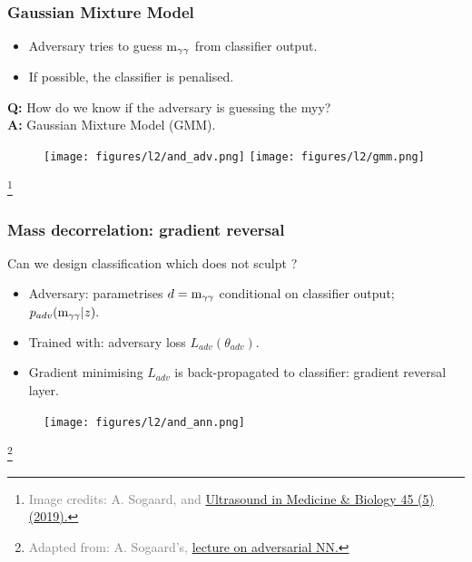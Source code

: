 \documentclass[11pt,xcolor=dvipsnames,aspectratio=169]{beamer}
\newcommand\blfootnote[1]{%
  \begingroup
  \renewcommand\thefootnote{}\footnote{\hspace{-30pt}\textcolor{Gray}{\tiny #1}}%
  \addtocounter{footnote}{-1}%
  \endgroup
}
\begin{document}
\begin{frame}
  \frametitle{\bf Gaussian Mixture Model}
  \begin{itemize}
  \item \textcolor{EDBRed}{Adversary} tries to guess $\mathrm{m}_{\gamma\gamma}$ from classifier output.
  \item If possible, the \textcolor{EDBBlue}{classifier} is penalised.
  \end{itemize}
  {\bf Q:} How do we know if the adversary is guessing the myy?\\
  {\bf A:} Gaussian Mixture Model (GMM).
  \begin{figure}
    \texttt{[image: figures/l2/and\_adv.png]}
    \texttt{[image: figures/l2/gmm.png]}
  \end{figure}
  \blfootnote{Image credits: A. Sogaard, and
    \href{http://dx.doi.org/10.1016/j.ultrasmedbio.2019.01.018}{Ultrasound in
      Medicine \& Biology 45 (5) (2019).}}
\end{frame}

\begin{frame}
  \frametitle{\bf Mass decorrelation: gradient reversal}
  Can we design classification which does not sculpt \myy{}?
  \begin{itemize}
  \item \textcolor{EDBRed}{Adversary}: parametrises $d=\mathrm{m}_{\gamma\gamma}{}$ conditional on classifier output; $p_{adv}(\mathrm{m}_{\gamma\gamma}{}|z).$
  \item Trained with: \textcolor{EDBRed}{adversary loss $L_{adv}(\theta_{adv})$}.
  \item Gradient minimising \textcolor{EDBRed}{$L_{adv}$} is back-propagated to
    \textcolor{EDBBlue}{classifier}: gradient reversal layer.
  \end{itemize}
  \begin{figure}
    \texttt{[image: figures/l2/and\_ann.png]}
  \end{figure}
  \blfootnote{Adapted from: A. Sogaard's,
    \href{https://github.com/asogaard/ep2mlf/blob/master/01-adversarial/2018-11-13_EP2MLF_AndreasSogaard.pdf}{lecture
    on adversarial NN.}}
\end{frame}
\end{document}
